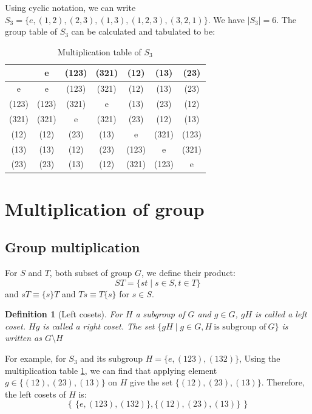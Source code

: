 \documentclass{amsart}
\newtheorem{definition}{Definition}
\begin{document}
Using cyclic notation, we can write $S_3 = \{ e, (1,2), (2,3), (1,3), (1,2,3), (3,2,1) \}$. We have $|S_3| = 6$. The group table of $S_3$ can be calculated 
and tabulated to be:
\begin{table}[h]
    \centering
    \caption{Multiplication table of $S_3$}
    \begin{tabular}{|c|ccc|ccc|}
        \hline
                & e     & (123) & (321) & (12)  & (13)  & (23)  \\ \hline
           e    & e     & (123) & (321) & (12)  & (13)  & (23)  \\ 
          (123) & (123) & (321) & e     & (13)  & (23)  & (12)  \\
          (321) & (321) & e     & (321) & (23)  & (12)  & (13)  \\ \hline
          (12)  & (12)  & (23)  & (13)  &     e & (321) & (123) \\
          (13)  & (13)  & (12)  & (23)  & (123) & e     & (321) \\
          (23)  & (23)  & (13)  & (12)  & (321) & (123) & e     \\ \hline
    \end{tabular}
    \label{T:s3}
\end{table}

\section*{Multiplication of group} 

\subsection*{Group multiplication}
For $S$ and $T$, both subset of group $G$, we define their product:
\begin{equation}
    ST = \{st\mid s\in S, t \in T\}
\end{equation}
and $sT \equiv \{s\}T $ and $Ts \equiv T\{s\} $ for $s \in S$.

\vspace{10pt}

\begin{definition}[Left cosets]
    For $H$ a subgroup of $G$ and $g \in G$, $gH$ is called a left coset. $Hg$ is called a right coset. 
    The set $\{gH \mid g \in G, H\ \text{is subgroup of}\ G\}$ is written as $G\setminus H$
\end{definition}

For example, for $S_3$ and its subgroup $H = \{e,(123),(132)\}$, 
Using the multiplication table \ref{T:s3}, we can find that
applying element $g \in \{(12), (23), (13)\}$ on $H$
give the set $\{(12), (23), (13)\}$. Therefore, the left cosets of $H$ is:
\[
    \left\{\, \{e,(123),(132)\}, \{(12), (23), (13)\}\, \right\}    
\]
\end{document}
